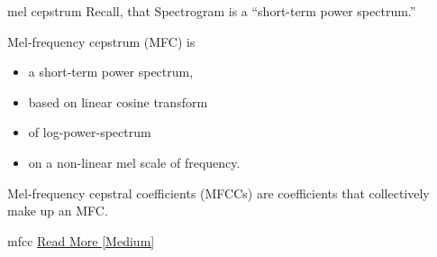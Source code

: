 \documentclass[aspectratio=169,xcolor={dvipsnames,svgnames}]{beamer}
\begin{document}
\begin{frame}[label={sec:org26721fe}]{mel cepstrum}
Recall, that Spectrogram is a ``short-term power
spectrum.''

Mel-frequency cepstrum (MFC) is
\begin{itemize}
\item a short-term power spectrum,
\item based on linear cosine transform
\item of log-power-spectrum
\item on a non-linear mel scale of frequency.
\end{itemize}

Mel-frequency cepstral coefficients (MFCCs) are
coefficients that collectively make up an MFC.
\end{frame}
\begin{frame}[label={sec:orgf3af9b8}]{mfcc}
\href{https://medium.com/analytics-vidhya/understanding-the-mel-spectrogram-fca2afa2ce53}{Read More [Medium]​}
\end{frame}
\end{document}

